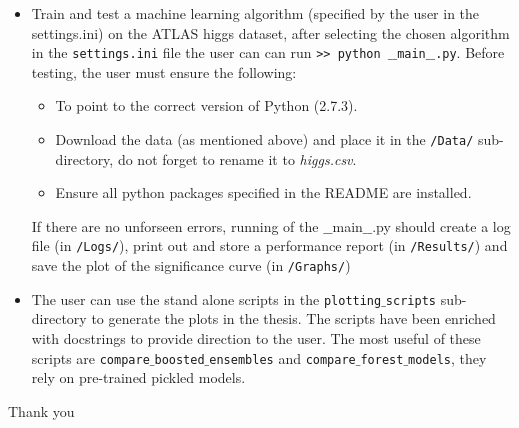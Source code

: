 \documentclass[a4paper,twoside]{article}
\begin{document}
\begin{itemize}
\item Train and test a machine learning algorithm (specified by the user in the settings.ini) on the ATLAS higgs dataset, after selecting the chosen algorithm in the \texttt{settings.ini} file the user can can run \texttt{>> python $\_\_$main$\_\_$.py}. Before testing, the user must ensure the following:
\begin{itemize}
\item To point to the correct version of Python (2.7.3).
\item Download the data (as mentioned above) and place it in the \texttt{/Data/} sub-directory, do not forget to rename it to \textit{higgs.csv}. 
\item Ensure all python packages specified in the README are installed. 
\end{itemize}
If there are no unforseen errors, running of the $\_\_$main$\_\_$.py should create a log file (in \texttt{/Logs/}), print out and store a performance report (in \texttt{/Results/}) and save the plot of the significance curve (in \texttt{/Graphs/})
\item The user can use the stand alone scripts in the \texttt{plotting$\_$scripts} sub-directory to generate the plots in the thesis. The scripts have been enriched with docstrings to provide direction to the user. The most useful of these scripts are \texttt{compare$\_$boosted$\_$ensembles} and \texttt{compare$\_$forest$\_$models}, they rely on pre-trained pickled models. 
\end{itemize}

\begin{center}
Thank you
\end{center}
\end{document}

